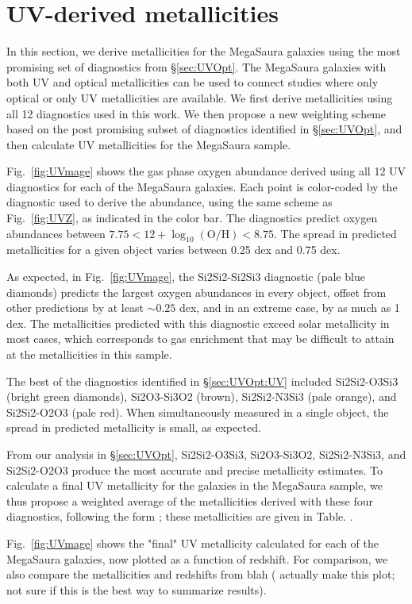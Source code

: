\documentclass[preprint2]{aastex62}
\newcommand{\logten}{\ensuremath{\log_{10}}}
\newcommand{\logOH}{\ensuremath{\logten (\mathrm{O}/\mathrm{H})}\xspace}
\newcommand{\mage}{{\sc Meg}a{\sc S}a{\sc ura}\xspace}
\newcommand{\XXX}{{\bf \color{red}{XXX} }}
\begin{document}
\section{UV-derived metallicities}\label{sec:UVZ}

In this section, we derive metallicities for the \mage galaxies using the most promising set of diagnostics from \S\ref{sec:UVOpt}. The \mage galaxies with both UV and optical metallicities can be used to connect studies where only optical or only UV metallicities are available. We first derive metallicities using all 12 diagnostics used in this work. We then propose a new weighting scheme based on the post promising subset of diagnostics identified in \S\ref{sec:UVOpt}, and then calculate UV metallicities for the \mage sample.

Fig.~\ref{fig:UVmage} shows the gas phase oxygen abundance derived using all 12 UV diagnostics for each of the \mage galaxies. Each point is color-coded by the diagnostic used to derive the abundance, using the same scheme as Fig.~\ref{fig:UVZ}, as indicated in the color bar. The diagnostics predict oxygen abundances between $7.75< 12+$\logOH$<8.75$. The spread in predicted metallicities for a given object varies between 0.25 dex and 0.75 dex.

As expected, in Fig.~\ref{fig:UVmage}, the Si2Si2-Si2Si3 diagnostic (pale blue diamonds) predicts the largest oxygen abundances in every object, offset from other predictions by at least $\sim0.25$ dex, and in an extreme case, by as much as 1\,dex. The metallicities predicted with this diagnostic exceed solar metallicity in most cases, which corresponds to gas enrichment that may be difficult to attain at the metallicities in this sample.

The best of the diagnostics identified in \S\ref{sec:UVOpt:UV} included Si2Si2-O3Si3 (bright green diamonds), Si2O3-Si3O2 (brown), Si2Si2-N3Si3 (pale orange), and Si2Si2-O2O3 (pale red). When simultaneously measured in a single object, the spread in predicted metallicity is small, as expected.

From our analysis in \S\ref{sec:UVOpt}, Si2Si2-O3Si3, Si2O3-Si3O2, Si2Si2-N3Si3, and Si2Si2-O2O3 produce the most accurate and precise metallicity estimates. To calculate a final UV metallicity for the galaxies in the \mage sample, we thus propose a weighted average of the metallicities derived with these four diagnostics, following the form \XXX; these metallicities are given in Table.\XXX.

Fig.~\ref{fig:UVmage} shows the "final" UV metallicity calculated for each of the \mage galaxies, now plotted as a function of redshift. For comparison, we also compare the metallicities and redshifts from blah (\XXX actually make this plot; not sure if this is the best way to summarize results).
\end{document}
